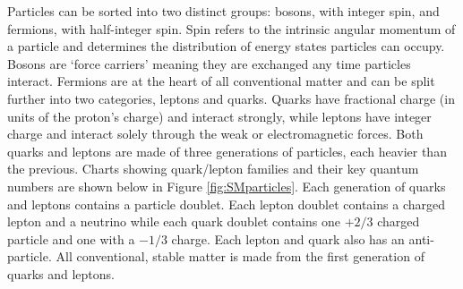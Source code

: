 Particles can be sorted into two distinct groups: bosons, with integer spin, and fermions, with half-integer spin. Spin refers to the intrinsic angular momentum of a particle and determines the distribution of energy states particles can occupy. Bosons are `force carriers' meaning they are exchanged any time particles interact. Fermions are at the heart of all conventional matter and can be split further into two categories, leptons and quarks. Quarks have fractional charge (in units of the proton's charge) and interact strongly, while leptons have integer charge and interact solely through the weak or electromagnetic forces. Both quarks and leptons are made of three generations of particles, each heavier than the previous. Charts showing quark/lepton families and their key quantum numbers are shown below in Figure \ref{fig:SMparticles}. Each generation of quarks and leptons contains a particle doublet. Each lepton doublet contains a charged lepton and a neutrino while each quark doublet contains one $+2/3$ charged particle and one with a $-1/3$ charge. Each lepton and quark also has an anti-particle. All conventional, stable matter is made from the first generation of quarks and leptons.

